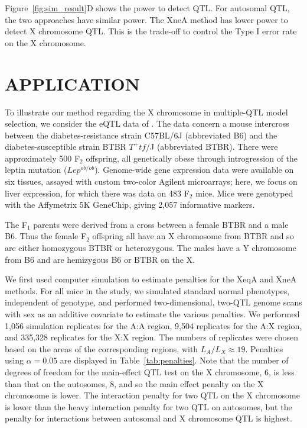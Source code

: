 \documentclass[12pt,letterpaper]{article}
\begin{document}
Figure~\ref{fig:sim_result}D shows the power to detect QTL. For
autosomal QTL, the two approaches have similar power. The XneA method
has lower power to detect X chromosome QTL. This is the trade-off to
control the Type I error rate on the X chromosome.



\clearpage
\section*{APPLICATION}

To illustrate our method regarding the X chromosome in multiple-QTL
model selection, we consider the eQTL data of \citet{Tian2016}. The
data concern a mouse intercross between the diabetes-resistance strain
C57BL/6J (abbreviated B6) and the diabetes-susceptible strain
BTBR $T^{+} tf$/J (abbreviated BTBR). There
were approximately 500 F$_2$ offspring, all genetically obese through
introgression of the leptin mutation ($Lep^{ob/ob}$). Genome-wide gene
expression data were available on six tissues, assayed with custom
two-color Agilent microarrays; here, we focus on liver expression, for
which there was data on 483 F$_2$ mice.
Mice were genotyped with the Affymetrix 5K GeneChip, giving 2,057
informative markers.

The F$_1$ parents were derived from a cross between a female BTBR and
a male B6. Thus the female F$_2$ offspring all have an X chromosome
from BTBR and so are either homozygous BTBR or heterozygous. The males
have a Y chromosome from B6 and are hemizygous B6 or BTBR on the X.

We first used computer simulation to estimate penalties for the XeqA
and XneA methods. For all mice in the study, we simulated standard
normal phenotypes, independent of genotype, and performed
two-dimensional, two-QTL genome scans with sex as an additive
covariate to estimate the various penalties. We performed 1,056
simulation replicates for the A:A region, 9,504 replicates for the A:X
region, and 335,328 replicates for the X:X region. The numbers of
replicates were chosen based on the areas of the corresponding
regions, with $L_A/L_X \approx 19$. Penalties using $\alpha=0.05$ are
displayed in Table~\ref{tab:penalties}.
Note that the number of degrees of freedom for the main-effect QTL test on
the X chromosome, $6$, is less than that on the autosomes, $8$, and so the
main effect penalty on the X chromosome is lower. The interaction
penalty for two QTL on the X chromosome is lower than the heavy
interaction penalty for two QTL on autosomes, but the
penalty for interactions between autosomal and X chromosome QTL is
highest.
\end{document}
